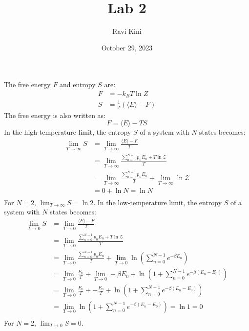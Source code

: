\documentclass{article}
\title{Lab 2}
\author{Ravi Kini}
\date{October 29, 2023}
\begin{document}
\maketitle


\problem
The free energy $F$ and entropy $S$ are:
\begin{equation}
    \begin{split}
        F & = -k_B T \ln Z \\
        S & = \frac{1}{T}\left(\langle E \rangle - F\right)
    \end{split}
\end{equation}
The free energy is also written as:
\begin{equation}
    F = \langle E \rangle - TS
\end{equation}
In the high-temperature limit, the entropy $S$ of a system with $N$ states becomes:
\begin{equation}
    \begin{split}
        \lim_{T\to\infty} S & = \lim_{T\to\infty} \frac{\langle E \rangle - F}{T} \\
        & = \lim_{T\to\infty} \frac{\sum_{n=0}^{N-1}p_n E_n + T\ln\mathcal{Z}}{T} \\
        & = \lim_{T\to\infty} \frac{\sum_{n=0}^{N-1}p_n E_n}{T} + \lim_{T\to\infty} \ln\mathcal{Z} \\
        & = 0 + \ln N = \ln N \\
    \end{split}
\end{equation}
For $N = 2$, $\lim_{T\to\infty} S = \ln 2$.
In the low-temperature limit, the entropy $S$ of a system with $N$ states becomes:
\begin{equation}
    \begin{split}
        \lim_{T\to 0} S & = \lim_{T\to 0} \frac{\langle E \rangle - F}{T} \\
        & = \lim_{T\to 0} \frac{\sum_{n=0}^{N-1}p_n E_n + T\ln\mathcal{Z}}{T} \\
        & = \lim_{T\to 0} \frac{\sum_{n=0}^{N-1}p_n E_n}{T} + \lim_{T\to 0} \ln(\sum_{n=0}^{N-1}e^{-\beta E_n}) \\
        & = \lim_{T\to 0} \frac{E_0}{T} + \lim_{T\to 0} -\beta E_0 + \ln(1 + \sum_{n=0}^{N-1}e^{-\beta (E_n - E_0)}) \\
        & = \lim_{T\to 0} \frac{E_0}{T} + -\frac{E_0}{T} + \ln(1 + \sum_{n=0}^{N-1}e^{-\beta (E_n - E_0)}) \\
        & = \lim_{T\to 0} \ln\left(1 + \sum_{n=0}^{N-1}e^{-\beta (E_n - E_0)}\right) = \ln 1 = 0 \\
    \end{split}
\end{equation}
For $N = 2$, $\lim_{T\to 0} S = 0$.
\end{document}
